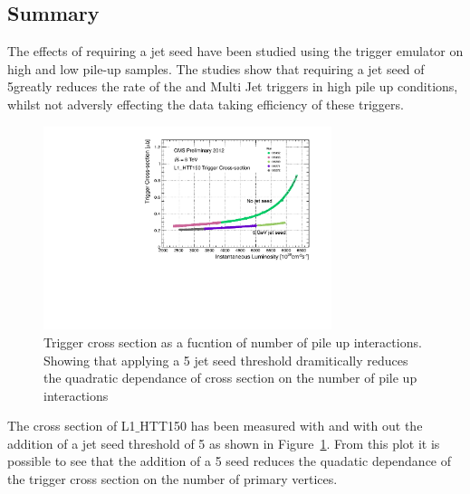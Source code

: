 
\subsection{Summary} %
\label{sec:Summary}
The effects of requiring a jet seed have been studied using the \Lone trigger 
emulator on high and low pile-up samples. The studies show that requiring a jet 
seed of 5\GeV greatly reduces the rate of the \HT and Multi Jet triggers in 
high pile up conditions, whilst not adversly effecting the data taking 
efficiency of these triggers.

\begin{figure}[ht]
  \centering
    \includegraphics[width=0.75\textwidth]{figures/LoneTrigger/HTT150_pileup.pdf}
  \caption{Trigger cross section as a fucntion of number of pile up 
  interactions. Showing that applying a 5 \GeV jet seed threshold dramitically 
  reduces the quadratic dependance of cross section on the number of pile up 
  interactions}
  \label{fig:figures_HTT150_pileup}
\end{figure}


The cross section of L1$\_$HTT150 has been measured with and with out the 
addition of a jet seed threshold of 5 \GeV as shown in  
Figure~\ref{fig:figures_HTT150_pileup}. From this plot it is possible to see 
that the addition of a 5 \GeV seed reduces the quadatic dependance of the 
trigger cross section on the number of primary vertices.



